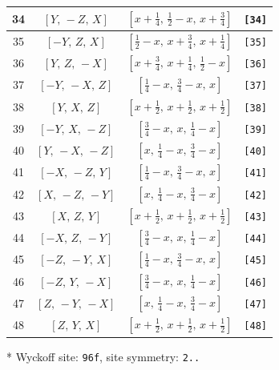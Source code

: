 \documentclass[fleqn,8pt]{jsarticle}
\begin{document}
\begin{longtable}{cccc}
34 & $\left[ Y,\, - Z,\, X \right]$ & $\left[ x + \frac{1}{4},\, \frac{1}{2} - x,\, x + \frac{3}{4} \right]$ & {\tt [34]} \\ \hline
35 & $\left[ - Y,\, Z,\, X \right]$ & $\left[ \frac{1}{2} - x,\, x + \frac{3}{4},\, x + \frac{1}{4} \right]$ & {\tt [35]} \\ \hline
36 & $\left[ Y,\, Z,\, - X \right]$ & $\left[ x + \frac{3}{4},\, x + \frac{1}{4},\, \frac{1}{2} - x \right]$ & {\tt [36]} \\ \hline
37 & $\left[ - Y,\, - X,\, Z \right]$ & $\left[ \frac{1}{4} - x,\, \frac{3}{4} - x,\, x \right]$ & {\tt [37]} \\ \hline
38 & $\left[ Y,\, X,\, Z \right]$ & $\left[ x + \frac{1}{2},\, x + \frac{1}{2},\, x + \frac{1}{2} \right]$ & {\tt [38]} \\ \hline
39 & $\left[ - Y,\, X,\, - Z \right]$ & $\left[ \frac{3}{4} - x,\, x,\, \frac{1}{4} - x \right]$ & {\tt [39]} \\ \hline
40 & $\left[ Y,\, - X,\, - Z \right]$ & $\left[ x,\, \frac{1}{4} - x,\, \frac{3}{4} - x \right]$ & {\tt [40]} \\ \hline
41 & $\left[ - X,\, - Z,\, Y \right]$ & $\left[ \frac{1}{4} - x,\, \frac{3}{4} - x,\, x \right]$ & {\tt [41]} \\ \hline
42 & $\left[ X,\, - Z,\, - Y \right]$ & $\left[ x,\, \frac{1}{4} - x,\, \frac{3}{4} - x \right]$ & {\tt [42]} \\ \hline
43 & $\left[ X,\, Z,\, Y \right]$ & $\left[ x + \frac{1}{2},\, x + \frac{1}{2},\, x + \frac{1}{2} \right]$ & {\tt [43]} \\ \hline
44 & $\left[ - X,\, Z,\, - Y \right]$ & $\left[ \frac{3}{4} - x,\, x,\, \frac{1}{4} - x \right]$ & {\tt [44]} \\ \hline
45 & $\left[ - Z,\, - Y,\, X \right]$ & $\left[ \frac{1}{4} - x,\, \frac{3}{4} - x,\, x \right]$ & {\tt [45]} \\ \hline
46 & $\left[ - Z,\, Y,\, - X \right]$ & $\left[ \frac{3}{4} - x,\, x,\, \frac{1}{4} - x \right]$ & {\tt [46]} \\ \hline
47 & $\left[ Z,\, - Y,\, - X \right]$ & $\left[ x,\, \frac{1}{4} - x,\, \frac{3}{4} - x \right]$ & {\tt [47]} \\ \hline
48 & $\left[ Z,\, Y,\, X \right]$ & $\left[ x + \frac{1}{2},\, x + \frac{1}{2},\, x + \frac{1}{2} \right]$ & {\tt [48]} \\
\end{longtable}
* Wyckoff site: {\tt 96f}, site symmetry: {\tt 2..}
\renewcommand{\arraystretch}{1.2}
\end{document}
